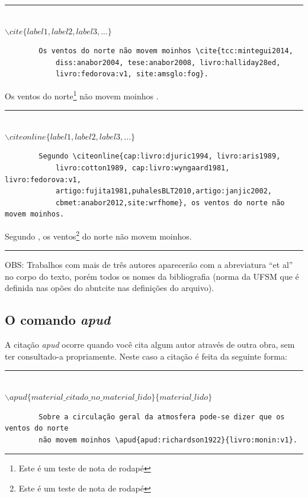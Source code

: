 \documentclass[oneside,openright,12pt]{ufsm_2021} %
\begin{document}
	\begin{center}\rule{0.5\textwidth}{1pt}\\$\backslash cite\{label1,label2,label3,...\}$\end{center}
	
	\begin{verbatim}
		Os ventos do norte não movem moinhos \cite{tcc:mintegui2014, 
			diss:anabor2004, tese:anabor2008, livro:halliday28ed, 
			livro:fedorova:v1, site:amsglo:fog}.
	\end{verbatim}
	
	\par Os ventos do norte\footnote{Este é um teste de nota de rodapé} não movem moinhos \cite{tcc:mintegui2014,diss:anabor2004,tese:anabor2008,livro:halliday28ed,livro:fedorova:v1,site:amsglo:fog}.
	
	\begin{center}\rule{0.5\textwidth}{1pt}\\$\backslash citeonline\{label1,label2,label3,...\}$\end{center}
	
	\begin{verbatim}
		Segundo \citeonline{cap:livro:djuric1994, livro:aris1989, 
			livro:cotton1989, cap:livro:wyngaard1981, livro:fedorova:v1, 
			artigo:fujita1981,puhalesBLT2010,artigo:janjic2002,
			cbmet:anabor2012,site:wrfhome}, os ventos do norte não movem moinhos.
	\end{verbatim}
	
	\par Segundo , os ventos\footnote{Este é um teste de nota de rodapé} do norte não movem moinhos.
	\begin{center}\rule{0.5\textwidth}{1pt}\end{center}   
	\par OBS: Trabalhos com mais de três autores aparecerão com a abreviatura ``et al'' no corpo do texto, porém todos os nomes da bibliografia (norma da UFSM que é definida nas opões do abntcite nas definições do arquivo). 
	
	\subsection{O comando \textit{apud}}
	
	\par A citação \textit{apud} ocorre quando você cita algum autor através de outra obra, sem ter consultado-a propriamente. Neste caso a citação é feita da seguinte forma:
	\begin{center}
		\rule{0.5\textwidth}{1pt}\\
		$\backslash apud\{material\_citado\_no\_material\_lido\}\{material\_lido\}$ \\
	\end{center}
	\begin{verbatim}
		Sobre a circulação geral da atmosfera pode-se dizer que os ventos do norte
		não movem moinhos \apud{apud:richardson1922}{livro:monin:v1}.
	\end{verbatim}
	
\end{document}
